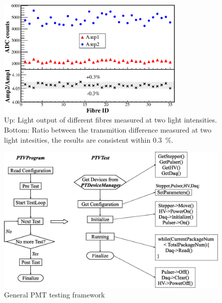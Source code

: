 \documentclass[5p, times]{elsarticle}
\begin{document}


\begin{figure}
 \centering
 \includegraphics[width=90mm]{fibre_diff}
\caption{Up: Light output of different fibres measured at two light intensities.
Bottom: Ratio between the transmition difference measured at two light intesities, the results are consistent within \textpm\SI{0.3}{\percent}.}
\label{fig:fibre_diff}
\end{figure} 

\begin{figure}
  \centering
 \includegraphics[width=120mm]{software_framework}
\caption{General PMT testing framework}
\label{fig:software_framework}
\end{figure}
\end{document}

